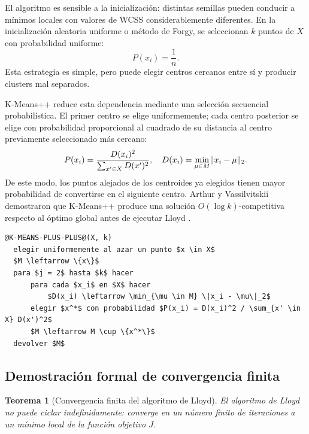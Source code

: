 \documentclass[11pt,letterpaper]{article}
\numberwithin{equation}{section}
\DeclarePairedDelimiter{\norm}{\lVert}{\rVert}
\theoremstyle{plain}
\newtheorem{teorema}{Teorema}[section]
\begin{document}
El algoritmo es sensible a la inicialización: distintas semillas pueden conducir a mínimos locales con valores de WCSS considerablemente diferentes. En la inicialización aleatoria uniforme o método de Forgy, se seleccionan $k$ puntos de $X$ con probabilidad uniforme:
\begin{equation}
P(x_i) = \frac{1}{n}.
\end{equation}
Esta estrategia es simple, pero puede elegir centros cercanos entre sí y producir clusters mal separados.

K-Means++ \citep{arthur2007} reduce esta dependencia mediante una selección secuencial probabilística. El primer centro se elige uniformemente; cada centro posterior se elige con probabilidad proporcional al cuadrado de su distancia al centro previamente seleccionado más cercano:
\begin{equation}\label{eq:kpp}
P(x_i) = \frac{D(x_i)^2}{\sum_{x' \in X} D(x')^2}, \quad D(x_i) = \min_{\mu \in M} \norm{x_i - \mu}_2.
\end{equation}
De este modo, los puntos alejados de los centroides ya elegidos tienen mayor probabilidad de convertirse en el siguiente centro. Arthur y Vassilvitskii demostraron que K-Means++ produce una solución $O(\log k)$-competitiva respecto al óptimo global antes de ejecutar Lloyd \citep{arthur2007}.

\begin{lstlisting}[caption={Inicialización K-Means++},label={alg:kpp}]
@K-MEANS-PLUS-PLUS@(X, k)
  elegir uniformemente al azar un punto $x \in X$
  $M \leftarrow \{x\}$
  para $j = 2$ hasta $k$ hacer
      para cada $x_i$ en $X$ hacer
          $D(x_i) \leftarrow \min_{\mu \in M} \|x_i - \mu\|_2$
      elegir $x^*$ con probabilidad $P(x_i) = D(x_i)^2 / \sum_{x' \in X} D(x')^2$
      $M \leftarrow M \cup \{x^*\}$
  devolver $M$
\end{lstlisting}

\subsection{Demostración formal de convergencia finita}

\begin{teorema}[Convergencia finita del algoritmo de Lloyd]\label{teo:convergencia}
El algoritmo de Lloyd no puede ciclar indefinidamente: converge en un número finito de iteraciones a un mínimo local de la función objetivo $J$.
\end{teorema}
\end{document}
